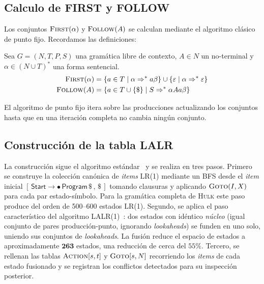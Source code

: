 \documentclass[11pt,a4paper,oneside,openany]{report}
\newcommand{\hulk}{\textsc{Hulk}}
\begin{document}
\subsection{Calculo de FIRST y FOLLOW}

Los conjuntos $\textsc{First}(\alpha)$ y $\textsc{Follow}(A)$ se calculan mediante
el algoritmo clásico de punto fijo. Recordamos las definiciones:

\begin{definition}[title={Definición: conjuntos FIRST y FOLLOW}]
Sea $G = (N, T, P, S)$ una gramática libre de contexto, $A \in N$ un no-terminal y
$\alpha \in (N \cup T)^*$ una forma sentencial.
\begin{align*}
  \textsc{First}(\alpha) &= \{ a \in T \mid \alpha \Rightarrow^* a\beta \}
    \cup \{ \varepsilon \mid \alpha \Rightarrow^* \varepsilon \} \\
  \textsc{Follow}(A) &= \{ a \in T \cup \{\$\} \mid S \Rightarrow^* \alpha A a \beta \}
\end{align*}
\end{definition}

El algoritmo de punto fijo itera sobre las producciones actualizando los conjuntos
hasta que en una iteración completa no cambia ningún conjunto.

\subsection{Construcción de la tabla LALR}

La construcción sigue el algoritmo estándar~\cite{aho2006,cooper2011} y se realiza en
tres pasos. Primero se construye la colección canónica de \textit{items} LR(1)
mediante un BFS desde el \textit{item} inicial
$[\,\textsf{Start} \rightarrow \bullet\,\textsf{Program}\,\$\,,\,\$\,]$ tomando
clausuras y aplicando $\textsc{Goto}(I, X)$ para cada par estado-símbolo. Para la
gramática completa de \hulk{} este paso produce del orden de 500--600 estados LR(1).
Segundo, se aplica el paso característico del algoritmo LALR(1)~\cite{deremer1969}:
dos estados con idéntico \textit{núcleo} (igual conjunto de pares producción-punto,
ignorando \textit{lookaheads}) se funden en uno solo, uniendo sus conjuntos de
\textit{lookaheads}. La fusión reduce el espacio de estados a aproximadamente
$\mathbf{263}$ estados, una reducción de cerca del $55\%$. Tercero, se rellenan las
tablas $\textsc{Action}[s,t]$ y $\textsc{Goto}[s,N]$ recorriendo los \textit{items}
de cada estado fusionado y se registran los conflictos detectados para su
inspección posterior.
\end{document}

